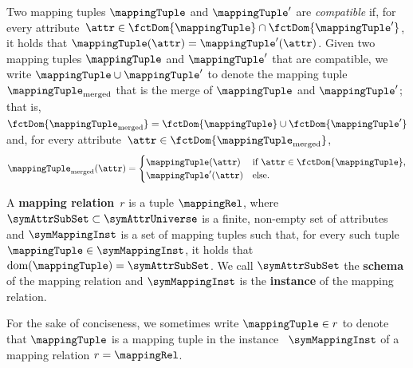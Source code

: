 Two mapping tuples $\mappingTuple$ and $\mappingTuple'$ are \emph{compatible} if, for every attribute~$\attr \in \fctDom{\mappingTuple} \cap \fctDom{\mappingTuple'}$, it holds that $\mappingTuple(\attr) = \mappingTuple'(\attr)$.
Given two mapping tuples $\mappingTuple$ and $\mappingTuple'$ that are compatible, we write $\mappingTuple \cup \mappingTuple'$ to denote the mapping tuple $\mappingTuple_\text{merged}$ that is the merge of $\mappingTuple$ and $\mappingTuple'$; that is, $\fctDom{\mappingTuple_\text{merged}} = \fctDom{\mappingTuple} \cup \fctDom{\mappingTuple'}$ and, for every attribute~$\attr \in \fctDom{\mappingTuple_\text{merged}}$,
\begin{equation*}
	\mappingTuple_\text{merged}(\attr) =
	\begin{cases}
		\mappingTuple(\attr) & \text{if $\attr \in \fctDom{\mappingTuple}$,} \\
		\mappingTuple'(\attr) & \text{else.}
	\end{cases}
\end{equation*}


\begin{definition}
	\normalfont
	A \textbf{mapping relation}~$r$ is a tuple $\mappingRel$, where
	$\symAttrSubSet \subset \symAttrUniverse$ is a finite, non-empty set of attributes
    and 	
	$\symMappingInst$ is a set of mapping tuples such
		that, for every such tuple~$\mappingTuple \in \symMappingInst$, it holds that $\mathrm{dom}(\mappingTuple) = \symAttrSubSet$.
	We call $\symAttrSubSet$ the \textbf{schema} of the mapping relation
	and $\symMappingInst$ is the \textbf{instance} of the mapping relation.
	\label{def:mapping_relation}
\end{definition}

For the sake of conciseness, we sometimes write $\mappingTuple \in r$ to denote that $\mappingTuple$ is a mapping tuple in
	the instance~%
$\symMappingInst$ of a mapping relation $r=\mappingRel$.


